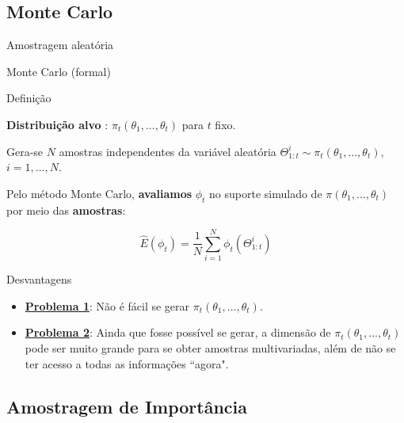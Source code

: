 \documentclass{beamer}
\begin{document}
\subsection{Monte Carlo}

\begin{frame}{Amostragem aleatória}

    \begin{block}{}
      \Huge  Monte Carlo (formal)
    \end{block}


\end{frame}

\begin{frame}{Definição}

\textbf{Distribuição alvo} : $\pi_t(\theta_1,...,\theta_t)$ para $t$ fixo.

\pause
\vspace{0.5cm}

Gera-se $N$ amostras independentes da variável aleatória $\Theta^i_{1:t} \sim \pi_t(\theta_1,...,\theta_t)$, $i=1,...,N$.

\pause
\vspace{0.5cm}

Pelo método Monte Carlo, \textbf{avaliamos}  $\phi_t$ no suporte simulado de $\pi(\theta_1,...,\theta_t)$ por meio das \textbf{amostras}:

$$
\hat{E}(\phi_t) = \frac{1}{N} \sum_{i=1}^N \phi_t(\Theta^i_{1:t})
$$



\end{frame}

\begin{frame}{Desvantagens}


\begin{itemize}

\item[] \underline{\textbf{Problema 1}}: Não é fácil se gerar $\pi_t(\theta_1,...,\theta_t)$. 
\pause 

\vspace{.5cm}
\item[] \underline{\textbf{Problema 2}}: Ainda que fosse possível se gerar, a dimensão de $\pi_t(\theta_1,...,\theta_t)$ pode ser muito grande para se obter amostras multivariadas, além de não se ter acesso a todas as informações ``agora".

\end{itemize}
\end{frame}


\subsection{Amostragem de Importância}
\end{document}

